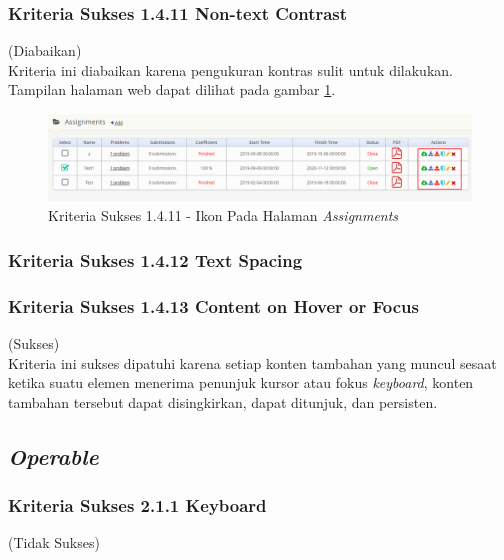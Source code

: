 \documentclass[a4paper,twoside]{article}
\begin{document}
\begin{enumerate}
		\subsubsection*{Kriteria Sukses 1.4.11 Non-text Contrast}
		\label{subsubsec:kepatuhan_kriteria_1.4.11}
		(Diabaikan) \\
		
		Kriteria ini diabaikan karena pengukuran kontras sulit untuk dilakukan. Tampilan halaman web dapat dilihat pada gambar \ref{fig:kepatuhan_1_4_11_reflow}.
		\begin{figure}[H]
			\centering  
			\includegraphics[scale=0.3]{kepatuhan_1_4_11}  
			\caption[Kriteria Sukses 1.4.11 - Ikon Pada Halaman \textit{Assignments}]{Kriteria Sukses 1.4.11 - Ikon Pada Halaman \textit{Assignments}} 
			\label{fig:kepatuhan_1_4_11_reflow} 
		\end{figure}
		
		\subsubsection*{Kriteria Sukses 1.4.12 Text Spacing}
		\label{subsubsec:kepatuhan_kriteria_1.4.12}
		
		\subsubsection*{Kriteria Sukses 1.4.13 Content on Hover or Focus}
		\label{subsubsec:kepatuhan_kriteria_1.4.13}
		(Sukses) \\
		
		Kriteria ini sukses dipatuhi karena setiap konten tambahan yang muncul sesaat ketika suatu elemen menerima penunjuk kursor atau fokus \textit{keyboard}, konten tambahan tersebut dapat disingkirkan, dapat ditunjuk, dan persisten.
		
		\subsection*{\textit{Operable}}
		\label{subsec:kepatuhan_operable}
		
		\subsubsection*{Kriteria Sukses 2.1.1 Keyboard}
		\label{subsubsec:kepatuhan_kriteria_2.1.1}
		(Tidak Sukses) \\
		

\end{enumerate}
\end{document}
